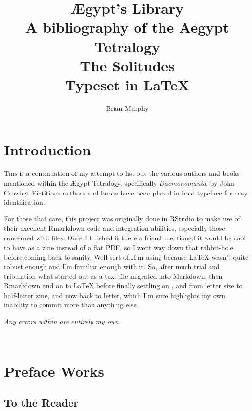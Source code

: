 \documentclass[10pt,makeidx]{extreport}
\author{Brian Murphy}
\title{
 {\Huge Ægypt's Library} \\
 {\footnotesize A bibliography of the Aegypt Tetralogy \\
 \bigskip
 {\Large The Solitudes} \\
 \bigskip
 Typeset in \LaTeX{} \\
 }
}
\date{\begin{small}\today{}\end{small}}
\newcommand\fleuron{\begin{turn}{45}\Large \ding{166}\end{turn}}
\newcommand\doublefleuron{%
	\reflectbox{\fleuron}\AC\staveXLIX\reflectbox{\AC}\fleuron}
\newcommand\fleuronbar{%
	{\huge\LinearACCCXIII}\xrfill[1.3ex]{1pt}\doublefleuron\xrfill[1.3ex]{1pt}\reflectbox{\huge\LinearACCCXIII}}
\newcommand\blankpage{%
    \null
    \thispagestyle{empty}%
    \addtocounter{page}{-1}%
    \newpage%
    \pagestyle{fancy}}
\newcommand\nbvspace[1][3]{\vspace*{\stretch{#1}}}
\newcommand{\chapterzodiac}[2]{%
  \chapter[\texorpdfstring{#2}{#2}]{%
    \color{Mahogany}\bfseries
    #2%
    \hfill
    {\shadowtext{{\color{Mahogany}\Huge\Zodiac{#1}}}}%
  }%
}
\begin{document}




\setcounter{tocdepth}{2}
\tableofcontents

\pagestyle{fancy}

\accanthis
\pagestyle{fancy}
\chapterzodiac{12}{Introduction}
\lettrine[lines=4,findent=3pt]{T}{his} is a continuation of my attempt to list out the various authors and books mentioned within the Ægypt Tetralogy, specifically \textit{Daemonomania}, by John Crowley. Fictitious authors and books have been placed in bold typeface for easy identification. 

For those that care, this project was originally done in RStudio to make use of their excellent Rmarkdown code and integration abilities, especially those concerned with  files. Once I finished it there a friend mentioned it would be cool to have as a zine instead of a flat PDF, so I went way down that rabbit-hole before coming back to sanity. Well sort of\dots I'm using  because \LaTeX{} wasn't quite robust enough and I'm familiar enough with it. So, after much trial and tribulation what started out as a text file migrated into Markdown, then Rmarkdown and on to \LaTeX{} before finally settling on , and from letter size to half-letter zine, and now back to letter, which I'm sure highlights my own inability to commit more than anything else.

\vspace*{1cm}

\begin{center}
	\textit{Any errors within are entirely my own.}
\end{center}

\begin{center}
\vfill
\shadowoffset{1pt}
\shadowtext{%
{\color{Mahogany}\fontsize{60}{64}\Mercury}}\\
\nbvspace[1]
\end{center}




\chapterzodiac{12}{Preface Works}
\section{To the Reader}
\end{document}
